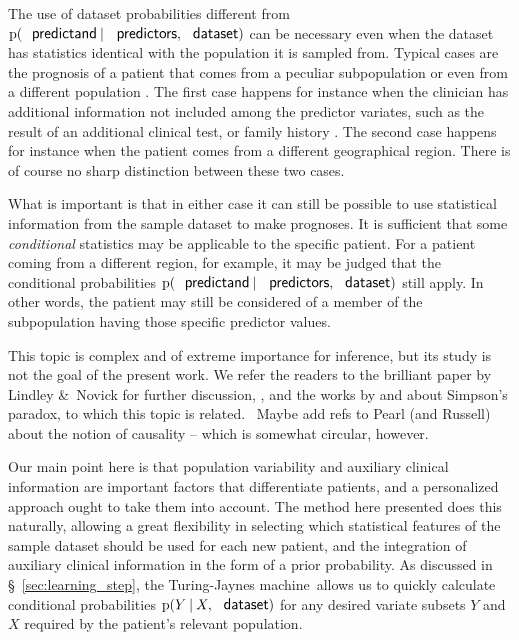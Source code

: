 \documentclass[utf8]{FrontiersinHarvard} %
\newcommand*{\puzzle}{{\fontencoding{U}\fontfamily{fontawesometwo}\selectfont\symbol{225}}}
\newcommand{\mynotez}[1]{{\color{notecolour}\puzzle\ #1}}
\newcommand*{\amp}{\&}
\newcommand*{\sect}{\S}%
\newcommand*{\chap}{ch.}%
\newcommand*{\p}{\mathrm{p}}%
\renewcommand*{\|}[1][]{\nonscript\:#1\vert\nonscript\:\mathopen{}}
\newcommand*{\tjm}{Turing-Jaynes machine}
\begin{document}
\medskip

The use of dataset probabilities different from $\p(\textsf{\small predictand} \| \textsf{\small predictors}, \textsf{\small dataset})$ can be necessary even when the dataset has statistics identical with the population it is sampled from. Typical cases are the prognosis of a patient that comes from a peculiar subpopulation or even from a different population \citetext{\citealp{lindleyetal1981}; \citealp{quintanaetal2017}; \citealp[\chap~4]{soxetal1988_r2013}; \citealp[\chap~5]{huninketal2001_r2014}}. The first case happens for instance when the clinician has additional information not included among the predictor variates, such as the result of an additional clinical test, or family history . The second case happens for instance when the patient comes from a different geographical region. There is of course no sharp distinction between these two cases.

What is important is that in either case it can still be possible to use statistical information from the sample dataset to make prognoses. It is sufficient that some \emph{conditional} statistics may be applicable to the specific patient. For a patient coming from a different region, for example, it may be judged that the conditional probabilities $\p(\textsf{\small predictand} \| \textsf{\small predictors}, \textsf{\small dataset})$ still apply. In other words, the patient may still be considered of a member of the subpopulation having those specific predictor values.

This topic is complex and of extreme importance for inference, but its study is not the goal of the present work. We refer the readers to the brilliant paper by Lindley \amp\ Novick \citeyearpar{lindleyetal1981} for further discussion, \cite{draperetal1993}, and the works by \cite{malinasetal2004_r2016} and \cite{sprengeretal2021} about Simpson's paradox, to which this topic is related. \mynotez{Maybe add refs to Pearl (and Russell) about the notion of causality -- which is somewhat circular, however.}

Our main point here is that population variability and auxiliary clinical information are important factors that differentiate patients, and a personalized approach ought to take them into account. The method here presented does this naturally, allowing a great flexibility in selecting which statistical features of the sample dataset should be used for each new patient, and the integration of auxiliary clinical information in the form of a prior probability. As discussed in \sect~\ref{sec:learning_step}, the \tjm\ allows us to quickly calculate conditional probabilities $\p(Y\|X, \textsf{\small dataset})$ for any desired variate subsets $Y$ and $X$ required by the patient's relevant population.
\end{document}
